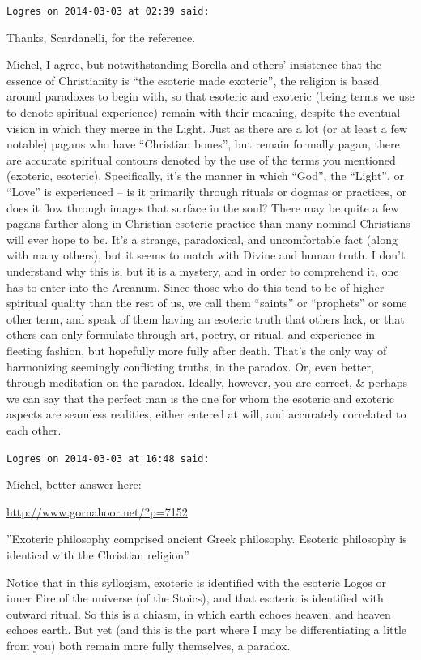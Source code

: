 \begin{footnotesize}
\begin{sffamily}
\hfill

\texttt{Logres on 2014-03-03 at 02:39 said:}

Thanks, Scardanelli, for the reference.

Michel, I agree, but notwithstanding Borella and others' insistence that the essence of Christianity is ``the esoteric made exoteric'', the religion is based around paradoxes to begin with, so that esoteric and exoteric (being terms we use to denote spiritual experience) remain with their meaning, despite the eventual vision in which they merge in the Light. Just as there are a lot (or at least a few notable) pagans who have ``Christian bones'', but remain formally pagan, there are accurate spiritual contours denoted by the use of the terms you mentioned (exoteric, esoteric). Specifically, it's the manner in which ``God'', the ``Light'', or ``Love'' is experienced -- is it primarily through rituals or dogmas or practices, or does it flow through images that surface in the soul? There may be quite a few pagans farther along in Christian esoteric practice than many nominal Christians will ever hope to be. It's a strange, paradoxical, and uncomfortable fact (along with many others), but it seems to match with Divine and human truth. I don't understand why this is, but it is a mystery, and in order to comprehend it, one has to enter into the Arcanum. Since those who do this tend to be of higher spiritual quality than the rest of us, we call them ``saints'' or ``prophets'' or some other term, and speak of them having an esoteric truth that others lack, or that others can only formulate through art, poetry, or ritual, and experience in fleeting fashion, but hopefully more fully after death. That's the only way of harmonizing seemingly conflicting truths, in the paradox. Or, even better, through meditation on the paradox. Ideally, however, you are correct, \& perhaps we can say that the perfect man is the one for whom the esoteric and exoteric aspects are seamless realities, either entered at will, and accurately correlated to each other.

\hfill

\texttt{Logres on 2014-03-03 at 16:48 said:}

Michel, better answer here:

\url{http://www.gornahoor.net/?p=7152}

''Exoteric philosophy comprised ancient Greek philosophy. Esoteric philosophy is identical with the Christian religion''

Notice that in this syllogism, exoteric is identified with the esoteric Logos or inner Fire of the universe (of the Stoics), and that esoteric is identified with outward ritual. So this is a chiasm, in which earth echoes heaven, and heaven echoes earth. But yet (and this is the part where I may be differentiating a little from you) both remain more fully themselves, a paradox.


\end{sffamily}
\end{footnotesize}
